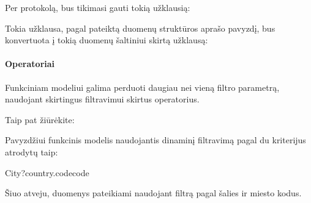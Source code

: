 \documentclass[letterpaper,10pt,lithuanian]{sphinxmanual}
\begin{document}
\sphinxAtStartPar
Per  protokolą, bus tikimasi gauti tokią užklausią:

\begin{sphinxVerbatim}[commandchars=\\\{\}]
  
\end{sphinxVerbatim}

\sphinxAtStartPar
Tokia  užklausa, pagal pateiktą duomenų struktūros aprašo pavyzdį, bus
konvertuota į tokią duomenų šaltiniui skirtą užklausą:

\begin{sphinxVerbatim}[commandchars=\\\{\}]
  
\end{sphinxVerbatim}


\paragraph{Operatoriai}
\label{\detokenize{modeliai/funkciniai:operatoriai}}
\sphinxAtStartPar
Funkciniam modeliui galima perduoti daugiau nei vieną filtro parametrą,
naudojant skirtingus filtravimui skirtus operatorius.


\begin{sphinxseealso}{Taip pat žiūrėkite:}

\begin{DUlineblock}{0em}
\item[] {\hyperref[\detokenize{formules:duomenu-atranka}]{}}
\end{DUlineblock}


\end{sphinxseealso}


\sphinxAtStartPar
Pavyzdžiui funkcinis modelis naudojantis dinaminį filtravimą pagal du
kriterijus atrodytų taip:

\begin{sphinxVerbatim}[commandchars=\\\{\}]
City?country.code\PYGZam{}code
\end{sphinxVerbatim}

\sphinxAtStartPar
Šiuo atveju, duomenys pateikiami naudojant filtrą pagal šalies ir miesto kodus.
\end{document}
